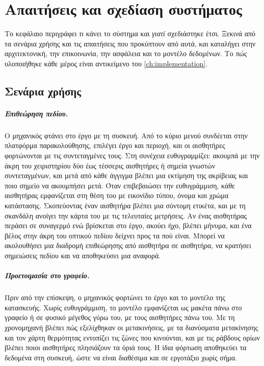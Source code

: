 \chapter{Απαιτήσεις και σχεδίαση συστήματος}
\label{ch:design}

Το κεφάλαιο περιγράφει \emph{τι} κάνει το σύστημα και \emph{γιατί} σχεδιάστηκε έτσι. Ξεκινά από τα σενάρια χρήσης και τις απαιτήσεις που προκύπτουν από αυτά, και καταλήγει στην αρχιτεκτονική, την επικοινωνία, την ασφάλεια και το μοντέλο δεδομένων. Το \emph{πώς} υλοποιήθηκε κάθε μέρος είναι αντικείμενο του \cref{ch:implementation}.

\section{Σενάρια χρήσης}
\label{sec:usecases}

\paragraph{Επιθεώρηση πεδίου.} Ο μηχανικός φτάνει στο έργο με τη συσκευή. Από το κύριο μενού συνδέεται στην πλατφόρμα παρακολούθησης, επιλέγει έργο και περιοχή, και οι αισθητήρες φορτώνονται με τις συντεταγμένες τους. Στη συνέχεια ευθυγραμμίζει: ακουμπά με την άκρη του χειριστηρίου δύο έως τέσσερις αισθητήρες ή σημεία γνωστών συντεταγμένων, και μετά από κάθε άγγιγμα βλέπει μια εκτίμηση της ακρίβειας και ποιο σημείο να ακουμπήσει μετά. Όταν επιβεβαιώσει την ευθυγράμμιση, κάθε αισθητήρας εμφανίζεται στη θέση του με εικονίδιο τύπου, όνομα και χρώμα κατάστασης. Σκοπεύοντας έναν αισθητήρα βλέπει μια σύντομη ετικέτα, και με τη σκανδάλη ανοίγει την κάρτα του με τις τελευταίες μετρήσεις. Αν ένας αισθητήρας περάσει σε συναγερμό ενώ βρίσκεται στο έργο, ακούει ήχο, βλέπει μήνυμα, και ένα βέλος στην άκρη του οπτικού πεδίου δείχνει προς τα πού είναι. Μπορεί να ακολουθήσει μια διαδρομή επιθεώρησης από αισθητήρα σε αισθητήρα, να κρατήσει σημειώσεις πεδίου και να αποθηκεύσει μια αναφορά.

\paragraph{Προετοιμασία στο γραφείο.} Πριν από την επίσκεψη, ο μηχανικός φορτώνει το έργο και το μοντέλο της κατασκευής. Χωρίς ευθυγράμμιση, το μοντέλο εμφανίζεται ως μακέτα πάνω στο γραφείο ή σε φυσικό μέγεθος γύρω του, με τους αισθητήρες πάνω του. Με τη χρονομηχανή βλέπει πώς εξελίχθηκαν οι μετακινήσεις, με τα διανύσματα μετακίνησης και τον χάρτη θερμότητας εντοπίζει τις ζώνες που κινούνται, και με τις ράβδους ορίων βλέπει ποιοι αισθητήρες πλησιάζουν τα όριά τους. Η ίδια φόρτωση αποθηκεύει τα δεδομένα στη συσκευή, ώστε να είναι διαθέσιμα και σε εργοτάξιο χωρίς σήμα.

